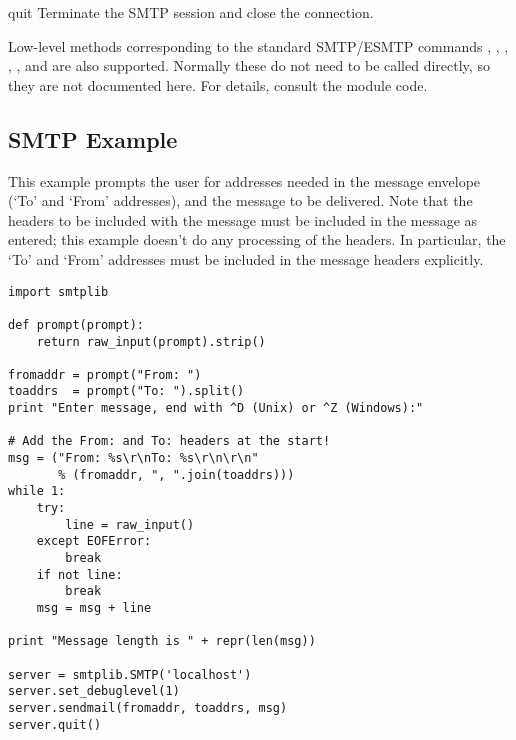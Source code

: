 \begin{methoddesc}{quit}{}
Terminate the SMTP session and close the connection.
\end{methoddesc}

Low-level methods corresponding to the standard SMTP/ESMTP commands
, , , , , and
 are also supported.  Normally these do not need to be
called directly, so they are not documented here.  For details,
consult the module code.


\subsection{SMTP Example \label{SMTP-example}}

This example prompts the user for addresses needed in the message
envelope (`To' and `From' addresses), and the message to be
delivered.  Note that the headers to be included with the message must
be included in the message as entered; this example doesn't do any
processing of the  headers.  In particular, the `To' and
`From' addresses must be included in the message headers explicitly.

\begin{verbatim}
import smtplib

def prompt(prompt):
    return raw_input(prompt).strip()

fromaddr = prompt("From: ")
toaddrs  = prompt("To: ").split()
print "Enter message, end with ^D (Unix) or ^Z (Windows):"

# Add the From: and To: headers at the start!
msg = ("From: %s\r\nTo: %s\r\n\r\n"
       % (fromaddr, ", ".join(toaddrs)))
while 1:
    try:
        line = raw_input()
    except EOFError:
        break
    if not line:
        break
    msg = msg + line

print "Message length is " + repr(len(msg))

server = smtplib.SMTP('localhost')
server.set_debuglevel(1)
server.sendmail(fromaddr, toaddrs, msg)
server.quit()
\end{verbatim}
